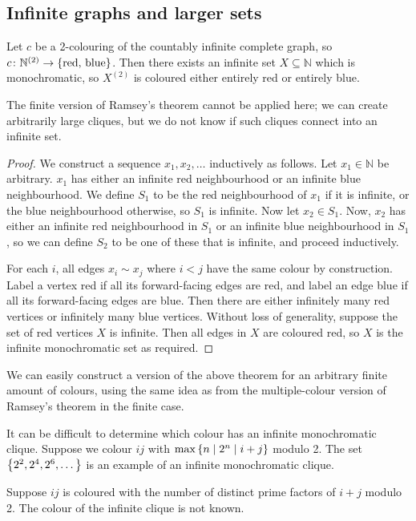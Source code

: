 \subsection{Infinite graphs and larger sets}
\begin{theorem}
	Let \( c \) be a 2-colouring of the countably infinite complete graph, so \( c \colon \mathbb N^{(2)} \to \qty{\text{red, blue}} \).
	Then there exists an infinite set \( X \subseteq \mathbb N \) which is monochromatic, so \( X^{(2)} \) is coloured either entirely red or entirely blue.
\end{theorem}
\begin{remark}
	The finite version of Ramsey's theorem cannot be applied here; we can create arbitrarily large cliques, but we do not know if such cliques connect into an infinite set.
\end{remark}
\begin{proof}
	We construct a sequence \( x_1, x_2, \dots \) inductively as follows.
	Let \( x_1 \in \mathbb N \) be arbitrary.
	\( x_1 \) has either an infinite red neighbourhood or an infinite blue neighbourhood.
	We define \( S_1 \) to be the red neighbourhood of \( x_1 \) if it is infinite, or the blue neighbourhood otherwise, so \( S_1 \) is infinite.
	Now let \( x_2 \in S_1 \).
	Now, \( x_2 \) has either an infinite red neighbourhood in \( S_1 \) or an infinite blue neighbourhood in \( S_1 \), so we can define \( S_2 \) to be one of these that is infinite, and proceed inductively.

	For each \( i \), all edges \( x_i \sim x_j \) where \( i < j \) have the same colour by construction.
	Label a vertex red if all its forward-facing edges are red, and label an edge blue if all its forward-facing edges are blue.
	Then there are either infinitely many red vertices or infinitely many blue vertices.
	Without loss of generality, suppose the set of red vertices \( X \) is infinite.
	Then all edges in \( X \) are coloured red, so \( X \) is the infinite monochromatic set as required.
\end{proof}
\begin{remark}
	We can easily construct a version of the above theorem for an arbitrary finite amount of colours, using the same idea as from the multiple-colour version of Ramsey's theorem in the finite case.
\end{remark}
\begin{example}
	It can be difficult to determine which colour has an infinite monochromatic clique.
	Suppose we colour \( ij \) with \( \max\qty{n \mid 2^n \mid i + j} \) modulo 2.
	The set \( \qty{2^2, 2^4, 2^6, \dots} \) is an example of an infinite monochromatic clique.

	Suppose \( ij \) is coloured with the number of distinct prime factors of \( i + j \) modulo 2.
	The colour of the infinite clique is not known.
\end{example}
